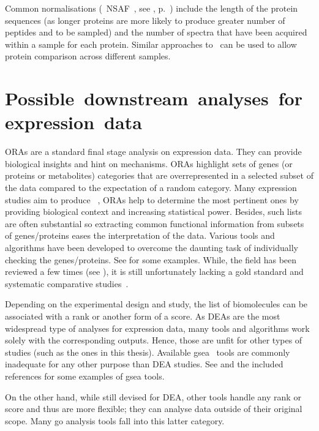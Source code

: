 Common normalisations
(\eg\ \gls{NSAF}~, see , p.~\pageref{eq:NSAF})
include the length of the protein sequences
(as longer proteins are more likely to produce greater number of peptides and
to be sampled) and the number of spectra that have been acquired within a sample
for each protein.
Similar approaches to \Rnaseq\ can be used to allow protein comparison
across different samples.\mybr\


\section{Possible~downstream~analyses~for~expression~data}\label{sec:enrichmentAnalysis}

\Glspl{ORA} are a standard final stage analysis on expression data.
They can provide biological insights and hint on mechanisms.
\Glspl{ORA} highlight sets of genes (or proteins or metabolites) categories
that are overrepresented in a selected subset of the data
compared to the expectation of a random category.
Many expression studies aim to produce ~,
\glspl{ORA} help to determine the most pertinent ones
by providing biological context and increasing statistical power.
Besides, such lists are often substantial
so extracting common functional information from subsets of genes/proteins eases
the interpretation of the data.
Various tools and algorithms have been developed
to overcome the daunting task of individually checking the genes/proteins.
See \citet{Shi_Jing2015-yh} for some examples.
While, the field has been reviewed a few times
(see \citet{Khatri2005-su,Huang2009-zk,Khatri2012-ki}),
it is still unfortunately lacking a gold standard
and systematic comparative studies~.\mybr\

Depending on the experimental design and study,
the list of biomolecules can be associated with a rank or another form of a score.
As \glspl{DEA} are the most widespread type of analyses for expression data,
many tools and algorithms work solely with the corresponding outputs.
Hence, those are unfit for other types of studies
(such as the ones in this thesis).
Available \gls{gsea}~ tools are commonly inadequate
for any other purpose than \gls{DEA} studies.
See \citet{Tamayo2012-qw,Irizarry2009-sc}
and the included references for some examples of \gls{gsea} tools.\mybr\

On the other hand, while still devised for \gls{DEA},
other tools handle any rank or score and thus are more flexible;
they can analyse data outside of their original scope.
Many \gls{go} analysis tools fall into this latter category.\mybr\

